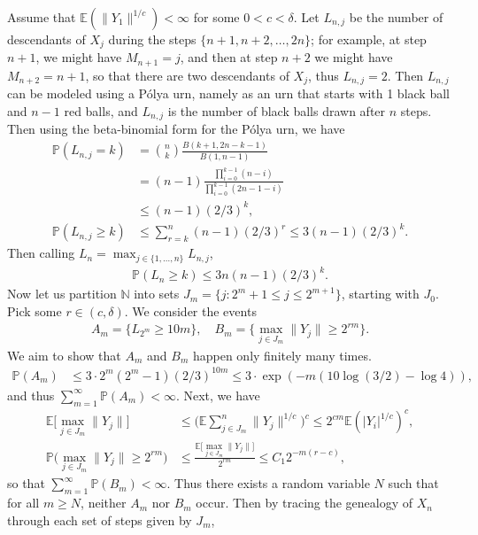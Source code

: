 \documentclass[12pt]{article}
\newcommand{\N}{\mathbb{N}}
\newcommand{\E}{\mathbb{E}}
\newcommand{\bP}{\mathbb{P}}
\begin{document}
Assume that $\E(\|Y_1\|^{1/c}) < \infty$ for some $0 < c < \delta$.
Let $L_{n, j}$ be the number of descendants of $X_j$ during the steps $\{n+1, n+2, \ldots, 2n\}$; for example, at step $n + 1$, we might have $M_{n + 1} = j$, and then at step $n + 2$ we might have $M_{n + 2} = n+1$, so that there are two descendants of $X_j$, thus $L_{n, j} = 2$. Then $L_{n, j}$ can be modeled using a P\'{o}lya urn, namely as an urn that starts with 1 black ball and $n - 1$ red balls, and $L_{n, j}$ is the number of black balls drawn after $n$ steps.
Then using the beta-binomial form for the P\'{o}lya urn, we have
\begin{align*}
    \bP(L_{n, j} = k) &= \binom{n}{k}\frac{B(k + 1, 2n - k - 1)}{B(1, n-1)} \\
    &= (n - 1)\frac{\prod_{i = 0}^{k - 1} (n - i)}{\prod_{i = 0}^{k - 1}(2n - 1 - i)} \\
    &\leq (n-1)(2/3)^k,\\
    \bP(L_{n, j} \geq k) &\leq \sum_{r = k}^n (n-1)(2/3)^{r} \leq 3(n-1)(2/3)^{k}.
\end{align*}
Then calling $L_n = \max_{j \in \{1, \ldots, n\}} L_{n, j}$,
\begin{align*}
    \bP(L_n \geq k) \leq 3 n(n -1)(2/3)^{k}.
\end{align*}
Now let us partition $\N$ into sets $J_m = \{ j : 2^m + 1\leq j \leq 2^{m + 1}\}$, starting with $J_0$. Pick some $r \in (c, \delta)$. We consider the events
\begin{align*}
    A_m = \{ L_{2^m} \geq 10m\}, \quad B_m = \Big\{ \max_{j \in J_{m}} \|Y_j\| \geq 2^{r m} \Big\}.
\end{align*}
We aim to show that $A_m$ and $B_m$ happen only finitely many times.
\begin{align*}
    \bP(A_m) &\leq 3 \cdot 2^m (2^m - 1) (2/3)^{10m} \leq 3 \cdot \exp(-m (10 \log (3/2) - \log 4)),
\end{align*}
and thus $\sum_{m = 1}^\infty \bP(A_m) < \infty$. Next, we have
\begin{align*}
    \E\Big[\max_{j \in J_m} \|Y_j\| \Big] &\leq \bigg(\E\sum_{j \in J_m}^n \|Y_j\|^{1/c}\bigg)^c \leq 2^{cm} \E(|Y_i|^{1/c})^c,\\
    \bP\Big(\max_{j \in J_m} \|Y_j\| \geq 2^{rm}\Big) &\leq \frac{\E\Big[\max_{j \in J_m} \|Y_j\| \Big]}{2^{rm}} \leq C_1 2^{-m(r-c)},
\end{align*}
so that $\sum_{m = 1}^\infty \bP(B_m) < \infty$.
Thus there exists a random variable $N$ such that for all $m \geq N$, neither $A_m$ nor $B_m$ occur. Then by tracing the genealogy of $X_n$ through each set of steps given by $J_m$,
\end{document}
